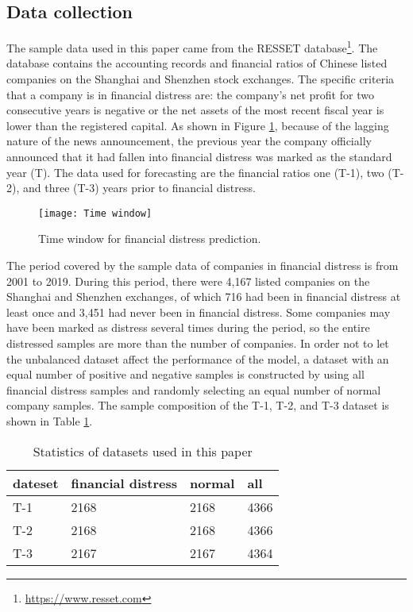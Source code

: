 \documentclass[review]{elsarticle}
\begin{document}
\subsection{Data collection}
The sample data used in this paper came from the RESSET database\footnote{\url{https://www.resset.com}}. The database contains the accounting records and financial ratios of Chinese listed companies on the Shanghai and Shenzhen stock exchanges. The specific criteria that a company is in financial distress are: the company's net profit for two consecutive years is negative or the net assets of the most recent fiscal year is lower than the registered capital. As shown in Figure \ref{fig: Time window}, because of the lagging nature of the news announcement, the previous year the company officially announced that it had fallen into financial distress was marked as the standard year (T). The data used for forecasting are the financial ratios one (T-1), two (T-2), and three (T-3) years prior to financial distress.

\begin{figure}[H]
    \centering
    \texttt{[image: Time window]}
    \caption{Time window for financial distress prediction.}
    \label{fig: Time window}
\end{figure}

The period covered by the sample data of companies in financial distress is from 2001 to 2019. During this period, there were 4,167 listed companies on the Shanghai and Shenzhen exchanges, of which 716 had been in financial distress at least once and 3,451 had never been in financial distress. Some companies may have been marked as distress several times during the period, so the entire distressed samples are more than the number of companies. In order not to let the unbalanced dataset affect the performance of the model, a dataset with an equal number of positive and negative samples is constructed by using all financial distress samples and randomly selecting an equal number of normal company samples. The sample composition of the T-1, T-2, and T-3 dataset is shown in Table \ref{table: Statistics}.

\begin{table}[H]
    \centering
    \caption{Statistics of datasets used in this paper}
    \label{table: Statistics}
    \begin{tabular}{llll}
    \hline
    dateset & financial distress & normal & all  \\ \hline
    T-1     & 2168               & 2168   & 4366 \\
    T-2     & 2168               & 2168   & 4366 \\
    T-3     & 2167               & 2167   & 4364 \\ \hline
    \end{tabular}
\end{table}
\end{document}
